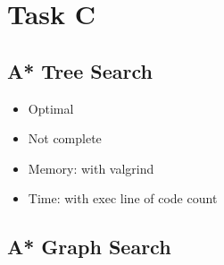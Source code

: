 
\chapter{Task C}
\section{A* Tree Search}
\begin{itemize}
\item Optimal
\item	Not complete
\item	Memory: with valgrind
\item Time: with exec line of code count
\end{itemize}
\section{A* Graph Search}


